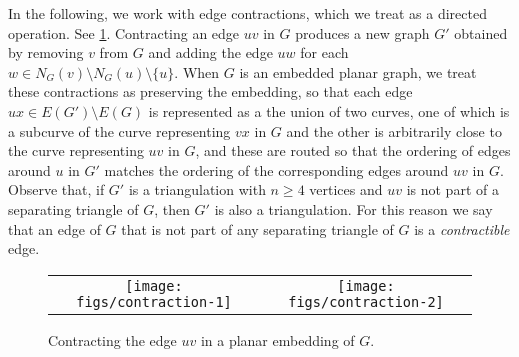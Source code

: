 \documentclass{patmorin}
\begin{document}
%

In the following, we work with edge contractions, which we treat as a directed operation. See \cref{contraction}. Contracting an edge $uv$ in $G$ produces a new graph $G'$ obtained by removing $v$ from $G$ and adding the edge $uw$ for each $w\in N_G(v)\setminus N_G(u)\setminus\{u\}$.  When $G$ is an embedded planar graph, we treat these contractions as preserving the embedding, so that each edge $ux\in E(G')\setminus E(G)$ is represented as a the union of two curves, one of which is a subcurve of the curve representing $vx$ in $G$ and the other is arbitrarily close to the curve representing $uv$ in $G$, and these are routed so that the ordering of edges around $u$ in $G'$ matches the ordering of the corresponding edges around $uv$ in $G$.  Observe that, if $G'$ is a triangulation with $n\ge 4$ vertices and $uv$ is not part of a separating triangle of $G$, then $G'$ is also a triangulation.  For this reason we say that an edge of $G$ that is not part of any separating triangle of $G$ is a \emph{contractible} edge.

\begin{figure}
    \begin{center}
        \begin{tabular}{cc}
            \texttt{[image: figs/contraction-1]} &
            \texttt{[image: figs/contraction-2]}
        \end{tabular}
    \end{center}
    \caption{Contracting the edge $uv$ in a planar embedding of $G$.}
    \label{contraction}
\end{figure}
\end{document}
